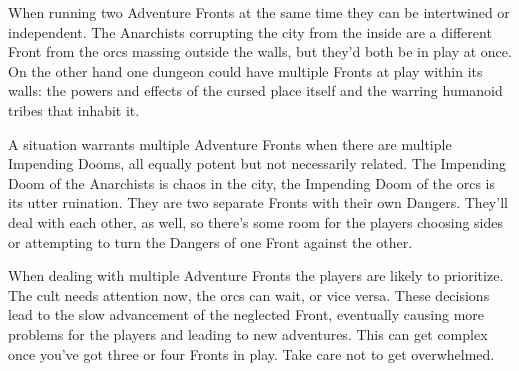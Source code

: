 When running two Adventure Fronts at the same time they can be intertwined or independent. The Anarchists corrupting the city from the inside are a different Front from the orcs massing outside the walls, but they'd both be in play at once. On the other hand one dungeon could have multiple Fronts at play within its walls: the powers and effects of the cursed place itself and the warring humanoid tribes that inhabit it.

       

A situation warrants multiple Adventure Fronts when there are multiple Impending Dooms, all equally potent but not necessarily related. The Impending Doom of the Anarchists is chaos in the city, the Impending Doom of the orcs is its utter ruination. They are two separate Fronts with their own Dangers. They'll deal with each other, as well, so there's some room for the players choosing sides or attempting to turn the Dangers of one Front against the other.

       

When dealing with multiple Adventure Fronts the players are likely to prioritize. The cult needs attention now, the orcs can wait, or vice versa. These decisions lead to the slow advancement of the neglected Front, eventually causing more problems for the players and leading to new adventures. This can get complex once you've got three or four Fronts in play. Take care not to get overwhelmed.

       
